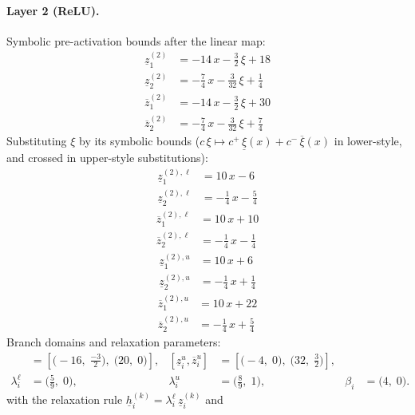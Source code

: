\documentclass[11pt]{article}
\begin{document}
\paragraph{Layer 2 (ReLU).}
Symbolic pre-activation bounds after the linear map:
\begin{align*}
\underline{z}^{(2)}_{1} &= -14\,x - \frac{3}{2}\,\xi + 18 \\
\underline{z}^{(2)}_{2} &= -\frac{7}{4}\,x - \frac{3}{32}\,\xi + \frac{1}{4}
\end{align*}
\begin{align*}
\overline{z}^{(2)}_{1} &= -14\,x - \frac{3}{2}\,\xi + 30 \\
\overline{z}^{(2)}_{2} &= -\frac{7}{4}\,x - \frac{3}{32}\,\xi + \frac{7}{4}
\end{align*}
Substituting $\xi$ by its symbolic bounds ($c\,\xi \mapsto c^{+}\,\underline{\xi}(x) + c^{-}\,\overline{\xi}(x)$ in lower-style, and crossed in upper-style substitutions):
\begin{align*}
\underline{z}^{(2),\ell}_{1} &= 10\,x - 6 \\
\underline{z}^{(2),\ell}_{2} &= -\frac{1}{4}\,x - \frac{5}{4}
\end{align*}
\begin{align*}
\overline{z}^{(2),\ell}_{1} &= 10\,x + 10 \\
\overline{z}^{(2),\ell}_{2} &= -\frac{1}{4}\,x - \frac{1}{4}
\end{align*}
\begin{align*}
\underline{z}^{(2),u}_{1} &= 10\,x + 6 \\
\underline{z}^{(2),u}_{2} &= -\frac{1}{4}\,x + \frac{1}{4}
\end{align*}
\begin{align*}
\overline{z}^{(2),u}_{1} &= 10\,x + 22 \\
\overline{z}^{(2),u}_{2} &= -\frac{1}{4}\,x + \frac{5}{4}
\end{align*}
Branch domains and relaxation parameters:
\begin{align*}
[\underline{z}^{\ell}_i, \overline{z}^{\ell}_i] &= [\bigl(-16,\; \frac{-3}{2}\bigr),\; \bigl(20,\; 0\bigr)], & [\underline{z}^{u}_i, \overline{z}^{u}_i] &= [\bigl(-4,\; 0\bigr),\; \bigl(32,\; \frac{3}{2}\bigr)], \\
\lambda^{\ell}_i &= \bigl(\frac{5}{9},\; 0\bigr), & \lambda^{u}_i &= \bigl(\frac{8}{9},\; 1\bigr), & \beta_i &= \bigl(4,\; 0\bigr).
\end{align*}
with the relaxation rule
$\underline{h}^{(k)}_i = \lambda^{\ell}_i\, \underline{z}^{(k)}_i$ and
\end{document}
